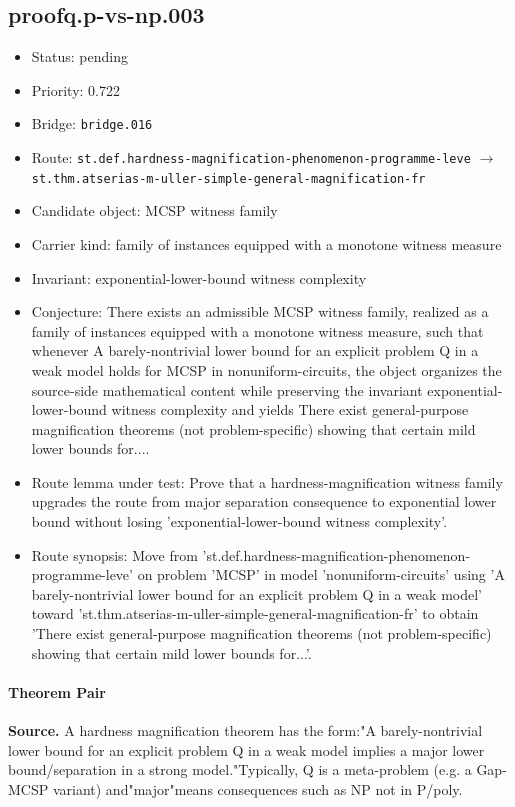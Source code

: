 \documentclass[11pt]{article}
\begin{document}
\subsection*{proofq.p-vs-np.003}
\begin{itemize}[leftmargin=*,itemsep=0.25em]
\item Status: pending
\item Priority: 0.722
\item Bridge: \texttt{bridge.016}
\item Route: \texttt{st.def.hardness-magnification-phenomenon-programme-leve} $\rightarrow$ \texttt{st.thm.atserias-m-uller-simple-general-magnification-fr}
\item Candidate object: MCSP witness family
\item Carrier kind: family of instances equipped with a monotone witness measure
\item Invariant: exponential-lower-bound witness complexity
\item Conjecture: There exists an admissible MCSP witness family, realized as a family of instances equipped with a monotone witness measure, such that whenever A barely-nontrivial lower bound for an explicit problem Q in a weak model holds for MCSP in nonuniform-circuits, the object organizes the source-side mathematical content while preserving the invariant exponential-lower-bound witness complexity and yields There exist general-purpose magnification theorems (not problem-specific) showing that certain mild lower bounds for....
\item Route lemma under test: Prove that a hardness-magnification witness family upgrades the route from major separation consequence to exponential lower bound without losing 'exponential-lower-bound witness complexity'.
\item Route synopsis: Move from 'st.def.hardness-magnification-phenomenon-programme-leve' on problem 'MCSP' in model 'nonuniform-circuits' using 'A barely-nontrivial lower bound for an explicit problem Q in a weak model' toward 'st.thm.atserias-m-uller-simple-general-magnification-fr' to obtain 'There exist general-purpose magnification theorems (not problem-specific) showing that certain mild lower bounds for...'.
\end{itemize}
\paragraph{Theorem Pair}
\textbf{Source.} A hardness magnification theorem has the form:"A barely-nontrivial lower bound for an explicit problem Q in a weak model implies a major lower bound/separation in a strong model."Typically, Q is a meta-problem (e.g. a Gap-MCSP variant) and"major"means consequences such as NP not in P/poly.
\end{document}

